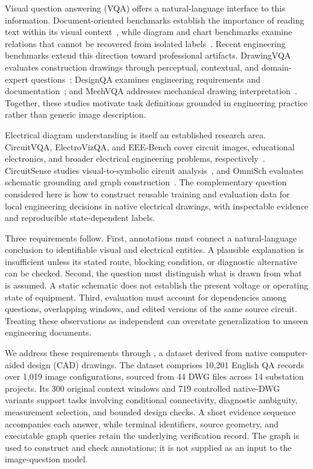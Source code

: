 Visual question answering (VQA) offers a natural-language interface to this information. Document-oriented benchmarks establish the importance of reading text within its visual context~\cite{singh2019textvqa,mathew2021docvqa}, while diagram and chart benchmarks examine relations that cannot be recovered from isolated labels~\cite{kembhavi2016diagram,masry2022chartqa}. Recent engineering benchmarks extend this direction toward professional artifacts. DrawingVQA evaluates construction drawings through perceptual, contextual, and domain-expert questions~\cite{jung2026drawingvqa}; DesignQA examines engineering requirements and documentation~\cite{doris2025designqa}; and MechVQA addresses mechanical drawing interpretation~\cite{kou2026mechvqa}. Together, these studies motivate task definitions grounded in engineering practice rather than generic image description.

Electrical diagram understanding is itself an established research area. CircuitVQA, ElectroVizQA, and EEE-Bench cover circuit images, educational electronics, and broader electrical engineering problems, respectively~\cite{mehta2024circuitvqa,meshram2024electrovizqa,li2025eeebench}. CircuitSense studies visual-to-symbolic circuit analysis~\cite{akbari2025circuitsense}, and OmniSch evaluates schematic grounding and graph construction~\cite{lu2026omnisch}. The complementary question considered here is how to construct reusable training and evaluation data for local engineering decisions in native electrical drawings, with inspectable evidence and reproducible state-dependent labels.

Three requirements follow. First, annotations must connect a natural-language conclusion to identifiable visual and electrical entities. A plausible explanation is insufficient unless its stated route, blocking condition, or diagnostic alternative can be checked. Second, the question must distinguish what is drawn from what is assumed. A static schematic does not establish the present voltage or operating state of equipment. Third, evaluation must account for dependencies among questions, overlapping windows, and edited versions of the same source circuit. Treating these observations as independent can overstate generalization to unseen engineering documents.

We address these requirements through \dataset, a dataset derived from native computer-aided design (CAD) drawings. The dataset comprises 10,201 English QA records over 1,019 image configurations, sourced from 44 DWG files across 14 substation projects. Its 300 original context windows and 719 controlled native-DWG variants support tasks involving conditional connectivity, diagnostic ambiguity, measurement selection, and bounded design checks. A short evidence sequence accompanies each answer, while terminal identifiers, source geometry, and executable graph queries retain the underlying verification record. The graph is used to construct and check annotations; it is not supplied as an input to the image-question model.

